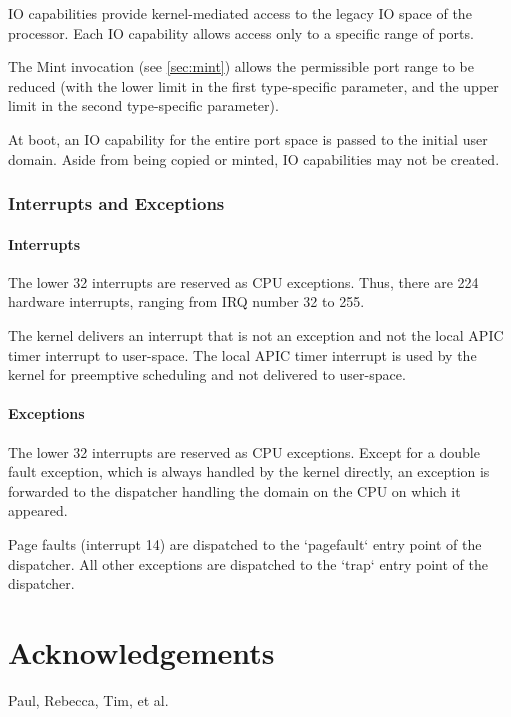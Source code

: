 \documentclass[a4paper,11pt,twoside]{report}
\begin{document}
IO capabilities provide kernel-mediated access to the legacy IO space of
the processor. Each IO capability allows access only to a specific range of
ports.

The Mint invocation (see \autoref{sec:mint}) allows the permissible
port range to be reduced (with the lower limit in the first
type-specific parameter, and the upper limit in the second type-specific
parameter).

At boot, an IO capability for the entire port space is passed to the
initial user domain. Aside from being copied or minted, IO capabilities may not
be created.

\subsection{Interrupts and Exceptions}

\subsubsection{Interrupts}

The lower 32 interrupts are reserved as CPU exceptions. Thus, there
are 224 hardware interrupts, ranging from IRQ number 32 to 255.

The kernel delivers an interrupt that is not an exception and not
the local APIC timer interrupt to user-space. The local APIC timer
interrupt is used by the kernel for preemptive scheduling and not
delivered to user-space.

\subsubsection{Exceptions}

The lower 32 interrupts are reserved as CPU exceptions. Except for a
double fault exception, which is always handled by the kernel
directly, an exception is forwarded to the dispatcher handling the
domain on the CPU on which it appeared.

Page faults (interrupt 14) are dispatched to the `pagefault` entry
point of the dispatcher. All other exceptions are dispatched to the
`trap` entry point of the dispatcher.

\chapter*{Acknowledgements}
Paul, Rebecca, Tim, et al.




\end{document}

